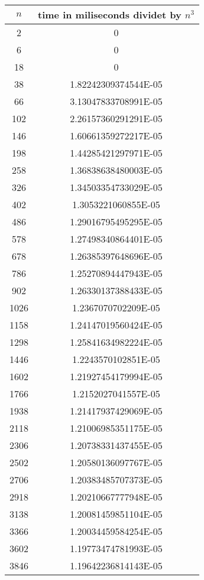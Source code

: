 \begin{table}[H]
\begin{tabular}{ |c|c| } 
 \hline
$n$ & time in miliseconds dividet by $n^3$ \\
\hline
2 & 0 \\
\hline
6 & 0 \\
\hline
18 & 0 \\
\hline
38 & 1.82242309374544E-05 \\
\hline
66 & 3.13047833708991E-05 \\
\hline
102 & 2.26157360291291E-05 \\
\hline
146 & 1.60661359272217E-05 \\
\hline
198 & 1.44285421297971E-05 \\
\hline
258 & 1.36838638480003E-05 \\
\hline
326 & 1.34503354733029E-05 \\
\hline
402 & 1.3053221060855E-05 \\
\hline
486 & 1.29016795495295E-05 \\
\hline
578 & 1.27498340864401E-05 \\
\hline
678 & 1.26385397648696E-05 \\
\hline
786 & 1.25270894447943E-05 \\
\hline
902 & 1.26330137388433E-05 \\
\hline
1026 & 1.2367070702209E-05 \\
\hline
1158 & 1.24147019560424E-05 \\
\hline
1298 & 1.25841634982224E-05 \\
\hline
1446 & 1.2243570102851E-05 \\
\hline
1602 & 1.21927454179994E-05 \\
\hline
1766 & 1.2152027041557E-05 \\
\hline
1938 & 1.21417937429069E-05 \\
\hline
2118 & 1.21006985351175E-05 \\
\hline
2306 & 1.20738331437455E-05 \\
\hline
2502 & 1.20580136097767E-05 \\
\hline
2706 & 1.20383485707373E-05 \\
\hline
2918 & 1.20210667777948E-05 \\
\hline
3138 & 1.20081459851104E-05 \\
\hline
3366 & 1.20034459584254E-05 \\
\hline
3602 & 1.19773474781993E-05 \\
\hline
3846 & 1.19642236814143E-05 \\

\end{tabular}
\end{table}
